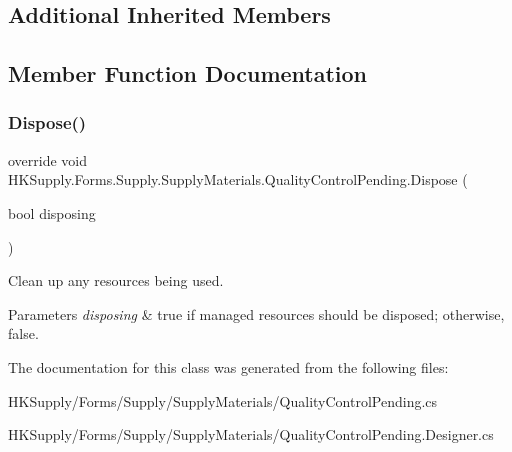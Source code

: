 \subsection*{Additional Inherited Members}


\subsection{Member Function Documentation}
\mbox{\label{class_h_k_supply_1_1_forms_1_1_supply_1_1_supply_materials_1_1_quality_control_pending_aba1df8d428e1f4b44f9d96bcde7cc59b}} 
\subsubsection{\texorpdfstring{Dispose()}{Dispose()}}
{\footnotesize\ttfamily override void H\+K\+Supply.\+Forms.\+Supply.\+Supply\+Materials.\+Quality\+Control\+Pending.\+Dispose (\begin{DoxyParamCaption}\item[{bool}]{disposing }\end{DoxyParamCaption})\hspace{0.3cm}{\ttfamily [protected]}}



Clean up any resources being used. 


\begin{DoxyParams}{Parameters}
{\em disposing} & true if managed resources should be disposed; otherwise, false.\\
\hline
\end{DoxyParams}


The documentation for this class was generated from the following files\+:\begin{DoxyCompactItemize}
\item 
H\+K\+Supply/\+Forms/\+Supply/\+Supply\+Materials/Quality\+Control\+Pending.\+cs\item 
H\+K\+Supply/\+Forms/\+Supply/\+Supply\+Materials/Quality\+Control\+Pending.\+Designer.\+cs\end{DoxyCompactItemize}
